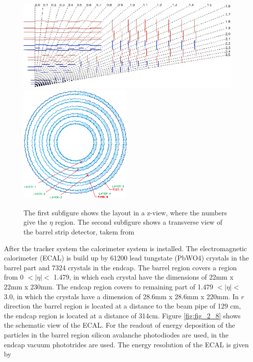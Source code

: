 \begin{figure}[ht]
	\centering
	\includegraphics[width=1\textwidth]{pictures/CMS_strip.pdf}
	\includegraphics[width=0.5\textwidth]{pictures/CMS_strip2.pdf}

	\caption[Strip detector of CMS]{The first subfigure shows the layout in a z-view, where the numbers give the $\eta$ region. The second subfigure shows a transverse view of the barrel strip detector, takem from \cite{CMS2, ECAL}}
	\label{fig:fig_2_7}
\end{figure}

After the tracker system the calorimeter system is installed. The electromagnetic calorimeter (\gls{ECAL}) \cite{CMS2, ECAL} is build up by 61200 lead tungstate (\gls{PbWO4}) crystals in the barrel part and 7324 crystals in the endcap. The barrel region covers a region from 0 $< |\eta| <$ 1.479, in which each crystal have the dimensions of 22mm x 22mm x 230mm. The endcap region covers to remaining part of 1.479 $< |\eta| <$ 3.0, in which the crystals have a dimension of 28.6mm x 28.6mm x 220mm. In $r$ direction the barrel region is located at a distance to the beam pipe of 129 cm, the endcap region is located at a distance of 314cm. Figure \ref{fig:fig_2_8} shows the schematic view of the \gls{ECAL}. For the readout of energy deposition of the particles in the barrel region silicon avalanche photodiodes are used, in the endcap vacuum phototrides are used. The energy resolution of the \gls{ECAL} is given by

